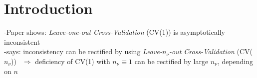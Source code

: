 \documentclass[Research_Module_ES.tex]{subfiles}
\begin{document}
\section{Introduction}	
-Paper shows: \textit{Leave-one-out Cross-Validation} (CV(1)) is asymptotically inconsistent\\
-says: inconsistency can be rectified by using \textit{Leave-$n_\nu$-out Cross-Validation} (CV($n_\nu$))
$~~\Rightarrow$ deficiency of CV(1) with $n_\nu\equiv 1$ can be rectified by large $n_\nu$, depending on $n$
\end{document}
